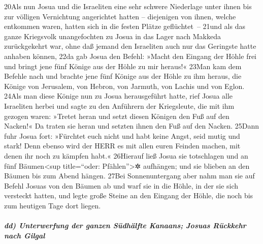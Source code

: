 20Als nun Josua und die Israeliten eine sehr schwere Niederlage unter
ihnen bis zur völligen Vernichtung angerichtet hatten -- diejenigen von
ihnen, welche entkommen waren, hatten sich in die festen Plätze
geflüchtet~-- 21und als das ganze Kriegsvolk unangefochten zu Josua in
das Lager nach Makkeda zurückgekehrt war, ohne daß jemand den Israeliten
auch nur das Geringste hatte anhaben können, 22da gab Josua den Befehl:
»Macht den Eingang der Höhle frei und bringt jene fünf Könige aus der
Höhle zu mir heraus!« 23Man kam dem Befehle nach und brachte jene fünf
Könige aus der Höhle zu ihm heraus, die Könige von Jerusalem, von
Hebron, von Jarmuth, von Lachis und von Eglon. 24Als man diese Könige
nun zu Josua herausgeführt hatte, rief Josua alle Israeliten herbei und
sagte zu den Anführern der Kriegsleute, die mit ihm gezogen waren:
»Tretet heran und setzt diesen Königen den Fuß auf den Nacken!« Da
traten sie heran und setzten ihnen den Fuß auf den Nacken. 25Dann fuhr
Josua fort: »Fürchtet euch nicht und habt keine Angst, seid mutig und
stark! Denn ebenso wird der HERR es mit allen euren Feinden machen, mit
denen ihr noch zu kämpfen habt.« 26Hierauf ließ Josua sie totschlagen
und an fünf Bäumen\textless sup title=``oder: Pfählen''\textgreater✲
aufhängen; und sie blieben an den Bäumen bis zum Abend hängen. 27Bei
Sonnenuntergang aber nahm man sie auf Befehl Josuas von den Bäumen ab
und warf sie in die Höhle, in der sie sich versteckt hatten, und legte
große Steine an den Eingang der Höhle, die noch bis zum heutigen Tage
dort liegen.

\hypertarget{dd-unterwerfung-der-ganzen-suxfcdhuxe4lfte-kanaans-josuas-ruxfcckkehr-nach-gilgal}{%
\subparagraph{dd) Unterwerfung der ganzen Südhälfte Kanaans; Josuas
Rückkehr nach
Gilgal}\label{dd-unterwerfung-der-ganzen-suxfcdhuxe4lfte-kanaans-josuas-ruxfcckkehr-nach-gilgal}}

